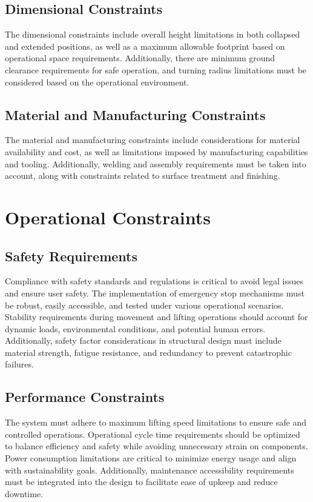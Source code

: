 \documentclass[../../main]{subfiles}
\begin{document}
\subsection{Dimensional Constraints}

The dimensional constraints include overall height limitations in both collapsed and extended positions, as well as a maximum allowable footprint based on operational space requirements. Additionally, there are minimum ground clearance requirements for safe operation, and turning radius limitations must be considered based on the operational environment.

\subsection{Material and Manufacturing Constraints}

The material and manufacturing constraints include considerations for material availability and cost, as well as limitations imposed by manufacturing capabilities and tooling. Additionally, welding and assembly requirements must be taken into account, along with constraints related to surface treatment and finishing.

\section{Operational Constraints}

\subsection{Safety Requirements}

Compliance with safety standards and regulations is critical to avoid legal issues and ensure user safety. The implementation of emergency stop mechanisms must be robust, easily accessible, and tested under various operational scenarios. Stability requirements during movement and lifting operations should account for dynamic loads, environmental conditions, and potential human errors. Additionally, safety factor considerations in structural design must include material strength, fatigue resistance, and redundancy to prevent catastrophic failures.
\newpage
\subsection{Performance Constraints}

The system must adhere to maximum lifting speed limitations to ensure safe and controlled operations. Operational cycle time requirements should be optimized to balance efficiency and safety while avoiding unnecessary strain on components. Power consumption limitations are critical to minimize energy usage and align with sustainability goals. Additionally, maintenance accessibility requirements must be integrated into the design to facilitate ease of upkeep and reduce downtime.
\end{document}
